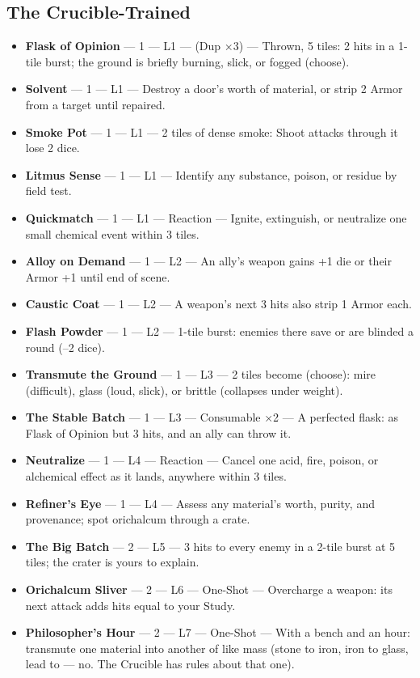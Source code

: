 \subsection{The Crucible-Trained}
\begin{itemize}
    \item \textbf{Flask of Opinion} --- 1 --- L1 --- (Dup ×3) --- Thrown, 5 tiles: 2 hits in a 1-tile burst; the ground is briefly burning, slick, or fogged (choose).
    \item \textbf{Solvent} --- 1 --- L1 --- Destroy a door's worth of material, or strip 2 Armor from a target until repaired.
    \item \textbf{Smoke Pot} --- 1 --- L1 --- 2 tiles of dense smoke: Shoot attacks through it lose 2 dice.
    \item \textbf{Litmus Sense} --- 1 --- L1 --- Identify any substance, poison, or residue by field test.
    \item \textbf{Quickmatch} --- 1 --- L1 --- Reaction --- Ignite, extinguish, or neutralize one small chemical event within 3 tiles.
    \item \textbf{Alloy on Demand} --- 1 --- L2 --- An ally's weapon gains +1 die or their Armor +1 until end of scene.
    \item \textbf{Caustic Coat} --- 1 --- L2 --- A weapon's next 3 hits also strip 1 Armor each.
    \item \textbf{Flash Powder} --- 1 --- L2 --- 1-tile burst: enemies there save or are blinded a round (--2 dice).
    \item \textbf{Transmute the Ground} --- 1 --- L3 --- 2 tiles become (choose): mire (difficult), glass (loud, slick), or brittle (collapses under weight).
    \item \textbf{The Stable Batch} --- 1 --- L3 --- Consumable ×2 --- A perfected flask: as Flask of Opinion but 3 hits, and an ally can throw it.
    \item \textbf{Neutralize} --- 1 --- L4 --- Reaction --- Cancel one acid, fire, poison, or alchemical effect as it lands, anywhere within 3 tiles.
    \item \textbf{Refiner's Eye} --- 1 --- L4 --- Assess any material's worth, purity, and provenance; spot orichalcum through a crate.
    \item \textbf{The Big Batch} --- 2 --- L5 --- 3 hits to every enemy in a 2-tile burst at 5 tiles; the crater is yours to explain.
    \item \textbf{Orichalcum Sliver} --- 2 --- L6 --- One-Shot --- Overcharge a weapon: its next attack adds hits equal to your Study.
    \item \textbf{Philosopher's Hour} --- 2 --- L7 --- One-Shot --- With a bench and an hour: transmute one material into another of like mass (stone to iron, iron to glass, lead to --- no. The Crucible has rules about that one).
\end{itemize}

